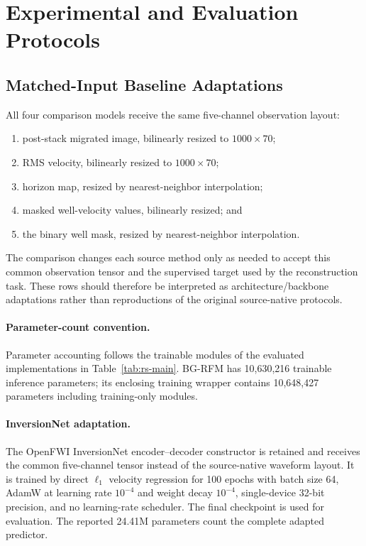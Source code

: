 \section{Experimental and Evaluation Protocols}
\label{app:protocol}
\setcounter{equation}{0}
\setcounter{table}{0}
\setcounter{figure}{0}

\subsection{Matched-Input Baseline Adaptations}
All four comparison models receive the same five-channel observation layout:
\begin{enumerate}
    \item post-stack migrated image, bilinearly resized to $1000\times70$;
    \item RMS velocity, bilinearly resized to $1000\times70$;
    \item horizon map, resized by nearest-neighbor interpolation;
    \item masked well-velocity values, bilinearly resized; and
    \item the binary well mask, resized by nearest-neighbor interpolation.
\end{enumerate}
The comparison changes each source method only as needed to accept this common observation tensor and the supervised target used by the reconstruction task. These rows should therefore be interpreted as architecture/backbone adaptations rather than reproductions of the original source-native protocols.

\paragraph{Parameter-count convention.}
Parameter accounting follows the trainable modules of the evaluated implementations in Table~\ref{tab:rs-main}. BG-RFM has 10,630,216 trainable inference parameters; its enclosing training wrapper contains 10,648,427 parameters including training-only modules.

\paragraph{InversionNet adaptation.}
The OpenFWI InversionNet encoder--decoder constructor is retained and receives the common five-channel tensor instead of the source-native waveform layout. It is trained by direct $\ell_1$ velocity regression for 100 epochs with batch size 64, AdamW at learning rate $10^{-4}$ and weight decay $10^{-4}$, single-device 32-bit precision, and no learning-rate scheduler. The final checkpoint is used for evaluation. The reported 24.41M parameters count the complete adapted predictor.

